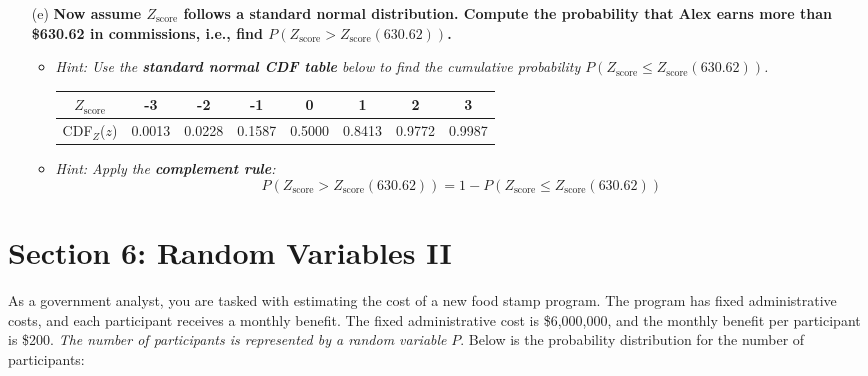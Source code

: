 \documentclass{article}
\newcommand{\blankbox}[2][3cm]{%
    \vspace{-0.5em}
    \begin{figure}[H]
        \makebox[\linewidth]{%
            \begin{tcolorbox}[
                colback=white,
                colframe=black,
                width=#2, %
                height=#1,
                boxrule=0.2mm
            ]
            \end{tcolorbox}
        }
    \end{figure}
    \vspace{-1em}
}
\begin{document}
\begin{enumerate}
\begin{enumerate}
        \item[(e)] \textbf{Now assume \( Z_{\text{score}} \) follows a standard normal distribution. Compute the probability that Alex earns more than \$630.62 in commissions, i.e., find \( P(Z_{\text{score}} > Z_{\text{score}}(630.62)) \).}
        \begin{itemize}
            \item \emph{Hint: Use the \textbf{standard normal CDF table} below to find the cumulative probability \( P(Z_{\text{score}} \leq Z_{\text{score}}(630.62)) \).}
        \begin{center}
        \begin{tabular}{c|c c c c c c c}
        \( Z_{\text{score}} \)  & -3  & -2  & -1  &  0  &  1  &  2  &  3  \\
        \hline
        CDF$_Z$(\(z\))  & 0.0013 & 0.0228 & 0.1587 & 0.5000 & 0.8413 & 0.9772 & 0.9987 \\
        \end{tabular}
        \end{center}
            \item \emph{Hint: Apply the \textbf{complement rule}:}
            \[
            P(Z_{\text{score}} > Z_{\text{score}}(630.62)) = 1 - P(Z_{\text{score}} \leq Z_{\text{score}}(630.62))
            \]
        \end{itemize}
        \blankbox[5cm]{1.1\textwidth}


    \end{enumerate}

\end{enumerate}

\newpage
\section*{Section 6: Random Variables II}

As a government analyst, you are tasked with estimating the cost of a new food stamp program. The program has fixed administrative costs, and each participant receives a monthly benefit. The fixed administrative cost is \$6,000,000, and the monthly benefit per participant is \$200. \emph{The number of participants is represented by a random variable} $P$. Below is the probability distribution for the number of participants:
\end{document}
